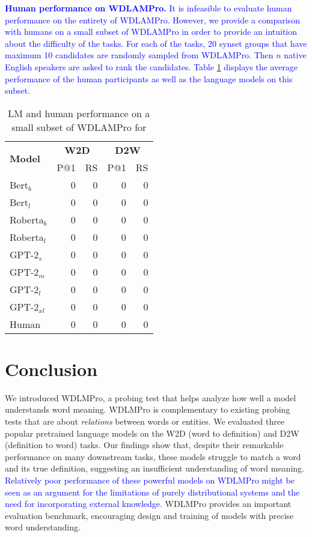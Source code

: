 \documentclass[11pt,a4paper]{article}
\begin{document}
\textcolor{blue}{
\textbf{Human performance on WDLAMPro.}
It is infeasible to evaluate human performance on the entirety of WDLAMPro. However, we provide a comparison with humans on a small subset of WDLAMPro in order to provide an intuition about the difficulty of the tasks. For each of the tasks, 20 synset groups that have maximum 10 candidates are randomly sampled from WDLAMPro. Then $n$ native English speakers are asked to rank the candidates. Table \ref{tab:human_eval} displays the average performance of the human participants as well as the language models on this subset. }


\begin{table}
    \centering
    \begin{tabular}{l|rrrr}
        \hline
         \multirow{2}{*}{\textbf{Model}} & \multicolumn{2}{c}{\textbf{W2D}} & \multicolumn{2}{c}{\textbf{D2W}} \\
         & \multicolumn{1}{c}{P@1} & \multicolumn{1}{c}{RS} & \multicolumn{1}{c}{P@1} & \multicolumn{1}{c}{RS} \\ \hline
     Bert$_{b}$ & 0 & 0 & 0 & 0 \\
     Bert$_{l}$ & 0 & 0 & 0 & 0 \\
     Roberta$_{b}$ & 0 & 0 & 0 & 0 \\
     Roberta$_{l}$ & 0 & 0 & 0 & 0 \\ \hline
     GPT-2$_{s}$ & 0 & 0 & 0 & 0 \\
     GPT-2$_{m}$ & 0 & 0 & 0 & 0 \\
     GPT-2$_{l}$ & 0 & 0 & 0 & 0 \\
     GPT-2$_{xl}$ & 0 & 0 & 0 & 0 \\ \hline 
     Human & 0 & 0 & 0 & 0 \\ \hline 
     
    \end{tabular}
    \caption{LM and human performance on a small subset of WDLAMPro for }
    \label{tab:human_eval}
\end{table}


\section{Conclusion}
We introduced
WDLMPro,
a
probing test that helps  analyze  how well a model
understands word meaning. WDLMPro is complementary to existing
probing tests that are about
\emph{relations} between words or entities.
We evaluated three popular pretrained language
models on the W2D (word to definition) and D2W (definition
to word) tasks. Our findings show
that, despite their remarkable performance on many
downstream tasks, these models struggle to match a word and
its true definition, suggesting an insufficient
understanding of word meaning.
\textcolor{blue}{Relatively poor performance of these
  powerful models on WDLMPro might be seen as an argument
  for the limitations of purely distributional systems and
  the need for incorporating external knowledge.} 
WDLMPro provides an important
evaluation benchmark, encouraging design and training of
models with precise word understanding.
\end{document}
